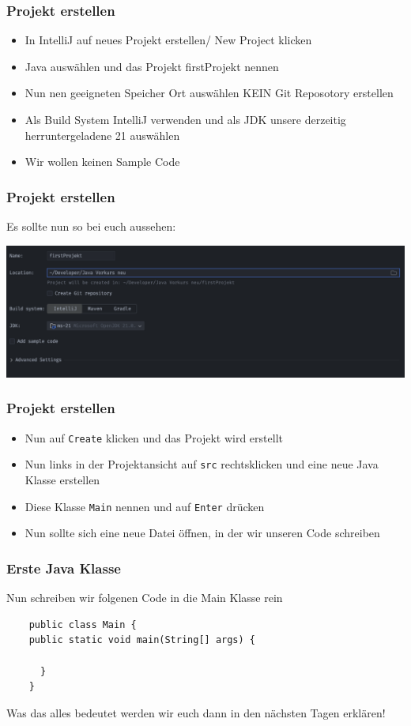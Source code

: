 \documentclass{../../presentation}
\begin{document}
\begin{frame}
  \frametitle{Projekt erstellen}
  \begin{itemize}
    \item In IntelliJ auf neues Projekt erstellen/ New Project klicken
    \item Java auswählen und das Projekt firstProjekt nennen
    \item Nun nen geeigneten Speicher Ort auswählen \achtung{} KEIN Git Reposotory erstellen
    \item Als Build System IntelliJ verwenden und als JDK unsere derzeitig herruntergeladene 21 auswählen
    \item Wir wollen keinen Sample Code
  \end{itemize}
\end{frame}

\begin{frame}
  \frametitle{Projekt erstellen}
  Es sollte nun so bei euch aussehen:

  \vspace{1cm}

  \includegraphics[width=1\linewidth]{img/projektCreation.png}
\end{frame}

\begin{frame}
  \frametitle{Projekt erstellen}
  \begin{itemize}
    \item Nun auf \texttt{Create} klicken und das Projekt wird erstellt
    \item Nun links in der Projektansicht auf \texttt{src} rechtsklicken und eine neue Java Klasse erstellen
    \item Diese Klasse \texttt{Main} nennen und auf \texttt{Enter} drücken
    \item Nun sollte sich eine neue Datei öffnen, in der wir unseren Code schreiben
  \end{itemize}
\end{frame}

\begin{frame}[fragile]
  \frametitle{Erste Java Klasse}
  Nun schreiben wir folgenen Code in die Main Klasse rein
  \begin{verbatim}
    public class Main {
    public static void main(String[] args) {
		
      }
    }
  \end{verbatim}
  \achtung{} Was das alles bedeutet werden wir euch dann in den nächsten Tagen erklären!
\end{frame}
\end{document}
